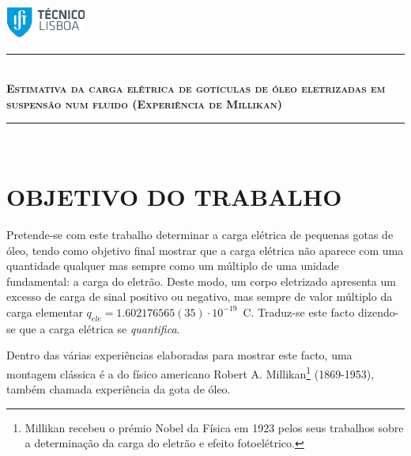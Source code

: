 \documentclass[a4paper,twoside,12pt]{article}      %
\author{Prof. Bernardo B. Carvalho}
\date{ Setembro 2012}
\newcommand{\HRule}{\rule{\linewidth}{0.5mm}}
\begin{document}
 

	\includegraphics[width=0.2\textwidth]{../../logo-ist}%

		\HRule \\[0.5cm]
	{ \large \bfseries   \textsc{Estimativa da carga elétrica de 
		gotículas de óleo eletrizadas em suspensão num fluido (Experiência de Millikan)} }\\[0.4cm] %
	\HRule \\%




\section{\sf OBJETIVO DO TRABALHO}
Pretende-se com este trabalho determinar a carga elétrica de pequenas gotas de óleo, tendo como objetivo final mostrar que a carga elétrica não aparece com uma quantidade qualquer mas sempre como um múltiplo de uma unidade fundamental: a carga do eletrão. Deste modo, um corpo eletrizado apresenta um excesso de carga de sinal positivo ou negativo, mas sempre de valor múltiplo da carga elementar $q_{ele}= 1.602176565(35)\cdot 10^{-19}\,$ C.
Traduz-se este facto dizendo-se que a carga elétrica se \emph{quantifica}.

Dentro das várias experiências elaboradas para mostrar este facto, uma montagem clássica é a do físico americano Robert A. Millikan\footnote{Millikan recebeu o prémio Nobel da Física em 1923 pelos seus trabalhos sobre a determinação da carga do eletrão e efeito fotoelétrico.} (1869-1953), também chamada experiência da gota de óleo.
\end{document}
